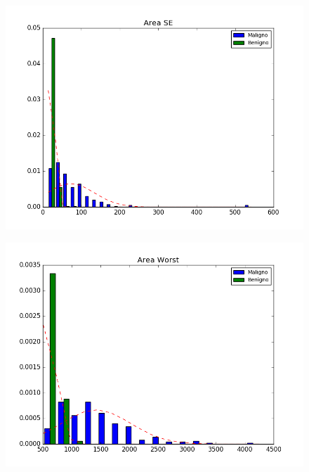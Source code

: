 \documentclass[11pt,a4paper]{article}
\numberwithin{equation}{section}
\begin{document}
\begin{itemize}
\begin{figure}[H]
\centering
\begin{minipage}{.5\textwidth}
  \centering
  \includegraphics[width=\linewidth]{../img/hist/area_se}
  \label{fig:test1}
\end{minipage}%
\begin{minipage}{.5\textwidth}
  \centering
  \includegraphics[width=\linewidth]{../img/hist/area_worst}
  \label{fig:test2}
\end{minipage}
\end{figure}


\end{itemize}
\end{document}
